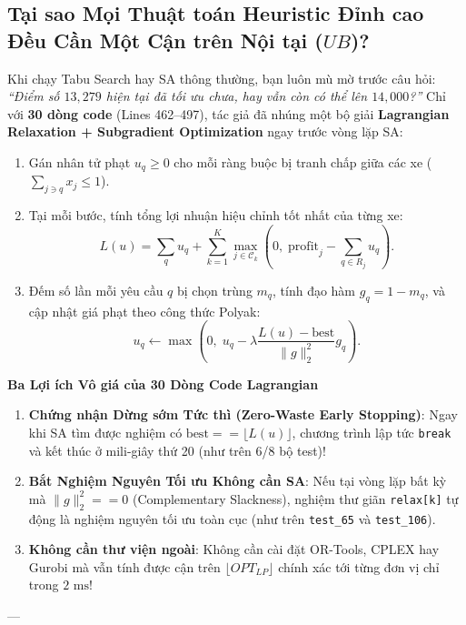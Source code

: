 \documentclass[11pt,a4paper]{article}
\newenvironment{optbox}[1]{%
    \par\medskip\noindent
    \begin{lrbox}{\calloutbox}%
    \begin{minipage}{\dimexpr\linewidth-2\fboxsep-2\fboxrule\relax}
    \textbf{\textcolor{accentgreen}{#1}}\par\smallskip
}{%
    \end{minipage}%
    \end{lrbox}%
    \fcolorbox{accentgreen}{softgreen}{\usebox{\calloutbox}}%
    \par\medskip
}
\begin{document}
\subsection{Tại sao Mọi Thuật toán Heuristic Đỉnh cao Đều Cần Một Cận trên Nội tại ($UB$)?}
Khi chạy Tabu Search hay SA thông thường, bạn luôn mù mờ trước câu hỏi: \textit{``Điểm số $13,279$ hiện tại đã tối ưu chưa, hay vẫn còn có thể lên $14,000$?''}
Chỉ với \textbf{30 dòng code} (Lines 462--497), tác giả đã nhúng một bộ giải \textbf{Lagrangian Relaxation + Subgradient Optimization} ngay trước vòng lặp SA:
\begin{enumerate}[leftmargin=1.5em]
    \item Gán nhân tử phạt $u_q \ge 0$ cho mỗi ràng buộc bị tranh chấp giữa các xe ($\sum_{j \ni q} x_j \le 1$).
    \item Tại mỗi bước, tính tổng lợi nhuận hiệu chỉnh tốt nhất của từng xe:
    \[
        L(u) = \sum_{q} u_q + \sum_{k=1}^K \max_{j \in \mathcal{C}_k} \left(0, \; \text{profit}_j - \sum_{q \in R_j} u_q\right).
    \]
    \item Đếm số lần mỗi yêu cầu $q$ bị chọn trùng $m_q$, tính đạo hàm $g_q = 1 - m_q$, và cập nhật giá phạt theo công thức Polyak:
    \[
        u_q \leftarrow \max\left(0, \; u_q - \lambda \frac{L(u) - \text{best}}{\|g\|_2^2} g_q\right).
    \]
\end{enumerate}
\begin{optbox}{Ba Lợi ích Vô giá của 30 Dòng Code Lagrangian}
\begin{enumerate}[leftmargin=1.2em]
    \item \textbf{Chứng nhận Dừng sớm Tức thì (Zero-Waste Early Stopping)}: Ngay khi SA tìm được nghiệm có $\text{best} == \lfloor L(u) \rfloor$, chương trình lập tức \texttt{break} và kết thúc ở mili-giây thứ 20 (như trên 6/8 bộ test)!
    \item \textbf{Bắt Nghiệm Nguyên Tối ưu Không cần SA}: Nếu tại vòng lặp bất kỳ mà $\|g\|_2^2 == 0$ (Complementary Slackness), nghiệm thư giãn \texttt{relax[k]} tự động là nghiệm nguyên tối ưu toàn cục (như trên \texttt{test\_65} và \texttt{test\_106}).
    \item \textbf{Không cần thư viện ngoài}: Không cần cài đặt OR-Tools, CPLEX hay Gurobi mà vẫn tính được cận trên $\lfloor OPT_{LP} \rfloor$ chính xác tới từng đơn vị chỉ trong $2\text{ ms}$!
\end{enumerate}
\end{optbox}

---

\end{document}

